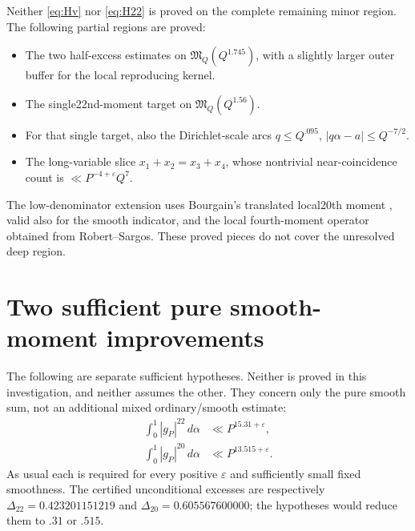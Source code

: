 \documentclass[11pt,letterpaper]{article}
\theoremstyle{remark}
\newcommand{\M}{\mathfrak M}
\newcommand{\eps}{\varepsilon}
\newcommand{\dd}{\,d\alpha}
\newcommand{\CurrentDeltaTwentyTwo}{0.423201151219}
\newcommand{\CurrentDeltaTwenty}{0.605567600000}
\begin{document}
Neither \eqref{eq:Hv} nor \eqref{eq:H22} is proved on the complete remaining minor
region. The following partial regions are proved:
\begin{itemize}
\item The two half-excess estimates on $\M_Q(Q^{1.745})$, with a slightly larger
      outer buffer for the local reproducing kernel.
\item The single22nd-moment target on $\M_Q(Q^{1.56})$.
\item For that single target, also the Dirichlet-scale arcs
      $q\le Q^{.095}$, $|q\alpha-a|\le Q^{-7/2}$.
\item The long-variable slice $x_1+x_2=x_3+x_4$, whose nontrivial near-coincidence
      count is $\ll P^{-4+\eps}Q^7$.
\end{itemize}
The low-denominator extension uses Bourgain's translated local20th moment
\cite[Section~6]{Bou16}, valid also for the smooth indicator, and the local
fourth-moment operator obtained from Robert--Sargos. These proved pieces do not
cover the unresolved deep region.

\newpage
\section{Two sufficient pure smooth-moment improvements}\label{sec:pure-targets}

The following are separate sufficient hypotheses. Neither is proved in this
investigation, and neither assumes the other. They concern only the pure smooth
sum, not an additional mixed ordinary/smooth estimate:
\begin{align}
 \int_0^1|g_P|^{22}\dd&\ll P^{15.31+\eps},\label{eq:pure22-target}\\
 \int_0^1|g_P|^{20}\dd&\ll P^{13.515+\eps}.\label{eq:pure20-target}
\end{align}
As usual each is required for every positive $\eps$ and sufficiently small fixed
smoothness. The certified unconditional excesses are respectively
$\Delta_{22}=\CurrentDeltaTwentyTwo$ and $\Delta_{20}=\CurrentDeltaTwenty$;
the hypotheses would reduce
them to $.31$ or $.515$.
\end{document}
